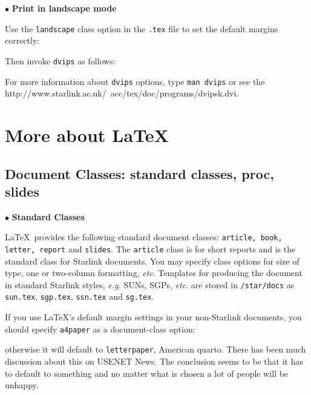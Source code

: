 \documentclass[11pt,twoside,nolof]{starlink}
\begin{document}
$\bullet$ \textbf{Print in landscape mode}

Use the \texttt{landscape} class option in the \texttt{.tex} file
to set the default margins correctly:


Then invoke \texttt{dvips} as follows:

\begin{terminalv}
\end{terminalv}

For more information about \texttt{dvips} options, type \texttt{man dvips} or
see the
    {http://www.starlink.ac.uk/~acc/tex/doc/programs/dvipsk.dvi}\cite[section 7, p. 26]{dvips}.

\section{\label{more_about_latex}More about \LaTeX}

\subsection{Document Classes: standard classes,
proc, slides}
\label{se:dstyle}

$\bullet$ \textbf{Standard Classes}

\LaTeX\ provides the following standard document classes:
\texttt{article, book, letter, report} and \texttt{slides}.
The \texttt{article} class is for short reports and is the standard class
for Starlink documents.
You may specify class options for size of type, one or two-column formatting,
\emph{etc}.
Templates for producing the document in standard Starlink styles,
\emph{e.g.} SUNs, SGPs, \emph{etc}. are stored in
\verb+/star/docs+ as \verb+sun.tex+, \verb+sgp.tex+, \verb+ssn.tex+ and
\verb+sg.tex+.

If you use \LaTeX's default margin settings in your non-Starlink documents,
you should specify \texttt{a4paper} as a document-class option:
otherwise it will default to \texttt{letterpaper}, American quarto.
There has been much discussion about this on USENET News.
The conclusion seems to be that it has to default to
something and no matter what is chosen a lot of people will be unhappy.
\end{document}
